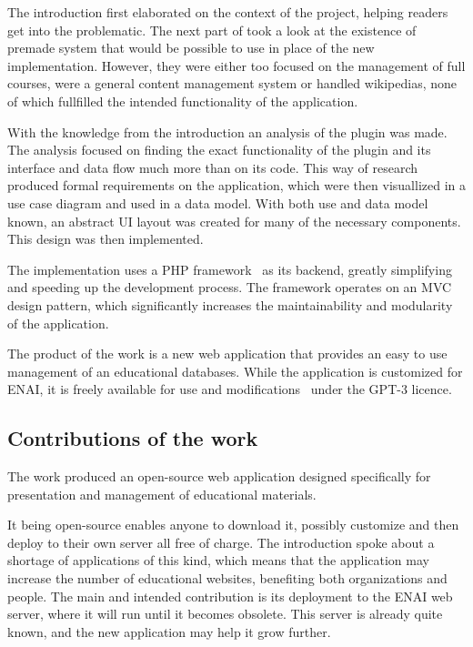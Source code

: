 \documentclass[
  digital,     %
  oneside,     %
  nosansbold,  %
  colorbold, %
  lof,         %
  lot,         %
]{fithesis4}
\begin{document}
The introduction first elaborated on the context of the project, helping readers get into the problematic.  The next part of took a look at the existence of premade system that would be possible to use in place of the new implementation. However, they were either too focused on the management of full courses, were a general content management system or handled wikipedias, none of which fullfilled the intended functionality of the application.

With the knowledge from the introduction an analysis of the plugin was made. The analysis focused on finding the exact functionality of the plugin and its interface and data flow much more than on its code. This way of research produced formal requirements on the application, which were then visuallized in a use case diagram and used in a data model. With both use and data model known, an abstract UI layout was created for many of the necessary components. This design was then implemented.

The implementation uses a PHP framework~\cite{codeigniter4} as its backend, greatly simplifying and speeding up the development process. The framework operates on an MVC design pattern, which significantly increases the maintainability and modularity of the application.

The product of the work is a new web application that provides an easy to use management of an educational databases. While the application is customized for ENAI, it is freely available for use and modifications~\cite{repository} under the GPT-3 licence.

\subsection{Contributions of the work}

The work produced an open-source web application designed specifically for presentation and management of educational materials. 

It being open-source enables anyone to download it, possibly customize and then deploy to their own server all free of charge. The introduction spoke about a shortage of applications of this kind, which means that the application may increase the number of educational websites, benefiting both organizations and people. The main and intended contribution is its deployment to the ENAI web server, where it will run until it becomes obsolete. This server is already quite known, and the new application may help it grow further.
\end{document}
